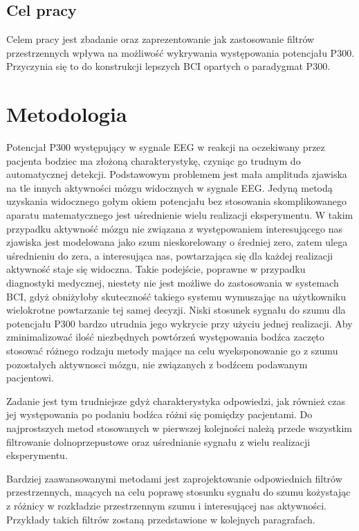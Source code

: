 \documentclass[licencjacka,openright]{pracamgr}
\begin{document}
\section{Cel pracy}

Celem pracy jest zbadanie oraz zaprezentowanie jak zastosowanie filtrów przestrzennych wpływa na możliwość wykrywania występowania potencjału P300. Przyczynia się to do konstrukcji lepszych BCI opartych o paradygmat P300.



\chapter{Metodologia}
Potencjał P300 występujący w sygnale EEG w reakcji na oczekiwany przez pacjenta bodziec ma złożoną charakterystykę, czyniąc go trudnym do automatycznej detekcji. Podstawowym problemem jest mała amplituda zjawiska na tle innych aktywności mózgu widocznych w sygnale EEG. Jedyną metodą uzyskania widocznego gołym okiem potencjału bez stosowania skomplikowanego aparatu matematycznego jest uśrednienie wielu realizacji eksperymentu. W takim przypadku aktywność mózgu nie związana z występowaniem interesującego nas zjawiska jest modelowana jako szum nieskorelowany o średniej zero, zatem ulega uśrednieniu do zera, a interesująca nas, powtarzająca się dla każdej realizacji aktywność staje się widoczna. Takie podejście, poprawne w przypadku diagnostyki medycznej, niestety nie jest możliwe do zastosowania w systemach BCI, gdyż obniżyłoby skuteczność takiego systemu wymuszając na użytkowniku wielokrotne powtarzanie tej samej decyzji. Niski stosunek sygnału do szumu dla potencjału P300 bardzo utrudnia jego wykrycie przy użyciu jednej realizacji. Aby zminimalizować ilość niezbędnych powtórzeń występowania bodźca zaczęto stosować różnego rodzaju metody mające na celu wyeksponowanie go z szumu pozostałych aktywnosci mózgu, nie związanych z bodźcem podawanym pacjentowi.

Zadanie jest tym trudniejsze gdyż charakterystyka odpowiedzi, jak również czas jej występowania po podaniu bodźca różni się pomiędzy pacjentami. Do najprostszych metod stosowanych w pierwszej kolejności należą przede wszystkim filtrowanie dolnoprzepustowe oraz uśrednianie sygnału z wielu realizacji eksperymentu.

Bardziej zaawansowanymi metodami jest zaprojektowanie odpowiednich filtrów przestrzennych, maących na celu poprawę stosunku sygnału do szumu kożystając z różnicy w rozkładzie przestrzennym szumu i interesującej nas aktywności. Przykłady takich filtrów zostaną przedstawione w kolejnych paragrafach.
\end{document}
